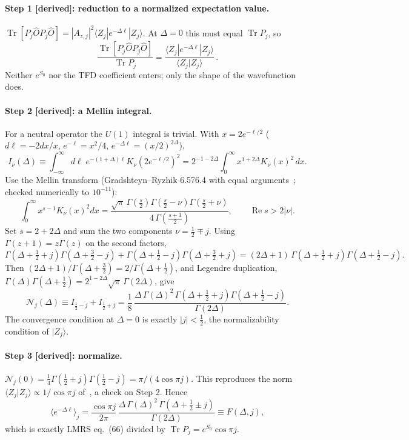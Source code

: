 \documentclass[11pt]{article}
\newcommand{\Tr}{\operatorname{Tr}}
\newcommand{\ket}[1]{\lvert #1\rangle}
\newcommand{\eS}{e^{S_0}}
\newcommand{\tagbox}[2]{\textsf{\small\color{#1}[#2]}}
\newcommand{\DER}{\tagbox{cder}{derived}}
\theoremstyle{remark}
\begin{document}
\paragraph{Step 1 \DER: reduction to a normalized expectation value.}
$\Tr[P_j\hat O P_j\hat O]=|A_{z,j}|^2\langle Z_j|e^{-\Delta\ell}|Z_j\rangle$. At $\Delta=0$ this must equal
$\Tr P_j$, so
\begin{equation}
\frac{\Tr[P_j\hat O P_j\hat O]}{\Tr P_j}=\frac{\langle Z_j|e^{-\Delta\ell}|Z_j\rangle}{\langle Z_j|Z_j\rangle}\,.
\label{eq:normexp}
\end{equation}
Neither $\eS$ nor the TFD coefficient enters; only the shape of the wavefunction does.

\paragraph{Step 2 \DER: a Mellin integral.} For a neutral operator the $U(1)$ integral is trivial. With $x=2e^{-\ell/2}$
($d\ell=-2dx/x$, $e^{-\ell}=x^2/4$, $e^{-\Delta\ell}=(x/2)^{2\Delta}$),
\[
I_\nu(\Delta)\equiv\int_{-\infty}^{\infty}\!d\ell\;e^{-(1+\Delta)\ell}K_\nu(2e^{-\ell/2})^2=2^{-1-2\Delta}\!\int_0^\infty\!x^{1+2\Delta}K_\nu(x)^2\,dx .
\]
Use the Mellin transform (Gradshteyn--Ryzhik 6.576.4 with equal arguments~\cite{GR}; checked numerically to $10^{-11}$):
\[
\int_0^\infty x^{s-1}K_\nu(x)^2dx=\frac{\sqrt\pi\,\Gamma(\frac s2)\Gamma(\frac s2-\nu)\Gamma(\frac s2+\nu)}{4\,\Gamma(\frac{s+1}2)},\qquad \operatorname{Re}s>2|\nu| .
\]
Set $s=2+2\Delta$ and sum the two components $\nu=\frac12\mp j$. Using $\Gamma(z+1)=z\Gamma(z)$ on the second factors,
\[
\Gamma(\Delta{+}\tfrac12{+}j)\Gamma(\Delta{+}\tfrac32{-}j)+\Gamma(\Delta{+}\tfrac12{-}j)\Gamma(\Delta{+}\tfrac32{+}j)
=(2\Delta+1)\,\Gamma(\Delta{+}\tfrac12{+}j)\Gamma(\Delta{+}\tfrac12{-}j).
\]
Then $(2\Delta+1)/\Gamma(\Delta+\frac32)=2/\Gamma(\Delta+\frac12)$, and Legendre duplication,
$\Gamma(\Delta)\Gamma(\Delta+\frac12)=2^{1-2\Delta}\sqrt\pi\,\Gamma(2\Delta)$, give
\begin{equation}
\mathcal N_j(\Delta)\equiv I_{\frac12-j}+I_{\frac12+j}
=\frac18\,\frac{\Delta\,\Gamma(\Delta)^2\,\Gamma(\Delta+\frac12+j)\Gamma(\Delta+\frac12-j)}{\Gamma(2\Delta)} .
\label{eq:Nj}
\end{equation}
The convergence condition at $\Delta=0$ is exactly $|j|<\frac12$, the normalizability condition of $\ket{Z_j}$.

\paragraph{Step 3 \DER: normalize.}
$\mathcal N_j(0)=\frac14\Gamma(\frac12+j)\Gamma(\frac12-j)=\pi/(4\cos\pi j)$. This reproduces the norm
$\langle Z_j|Z_j\rangle\propto1/\cos\pi j$ of~\cite[eq.~26]{LMRS}, a check on Step 2. Hence
\begin{equation}
\langle e^{-\Delta\ell}\rangle_j=\frac{\cos\pi j}{2\pi}\,\frac{\Delta\,\Gamma(\Delta)^2\,\Gamma(\Delta+\frac12\pm j)}{\Gamma(2\Delta)}
\equiv F(\Delta,j),
\label{eq:Fdj}
\end{equation}
which is exactly LMRS eq.~(66) divided by $\Tr P_j=\eS\cos\pi j$.
\end{document}
